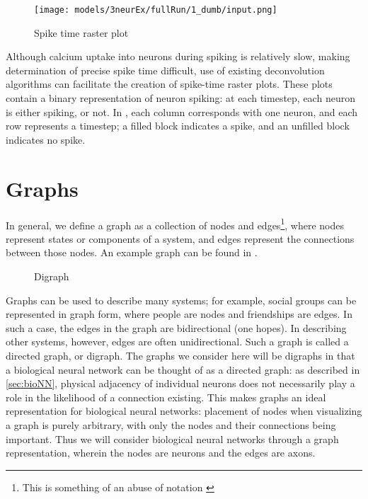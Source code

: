 \begin{wrapfigure}[8]{r}{.25\textwidth}
	\centering
	\vspace{-14pt}
	\texttt{[image: models/3neurEx/fullRun/1\_dumb/input.png]}
	\captionsetup{width=.85\linewidth}
	\caption{Spike time raster plot}
	\label{fig:rasterplot}
\end{wrapfigure}
Although calcium uptake into neurons during spiking is relatively slow, making 
determination of precise spike time difficult, use of existing deconvolution 
algorithms can facilitate the creation of spike-time raster plots\cite{Xu8025}.  
These plots contain a binary representation of neuron spiking: at each timestep, 
each neuron is either spiking, or not. In , each column 
corresponds with one neuron, and each row represents a timestep; a filled block 
indicates a spike, and an unfilled block indicates no spike.


\section{Graphs}
In general, we define a graph as a collection of nodes and edges\footnote{This 
is something of an abuse of notation \cite{networksciencebook}}, where nodes 
represent states or components of a system, and edges represent the connections 
between those nodes\cite{networksciencebook}. An example graph can be found in 
.

\begin{wrapfigure}[6]{l}{.28\textwidth}
	\centering
	\vspace{-5pt}
	
	\caption{Digraph}
	\label{fig:digraph}
\end{wrapfigure}
\noindent Graphs can be used to describe many systems; for example, social 
groups can be represented in graph form, where people are nodes and friendships 
are edges.  In such a case, the edges in the graph are bidirectional (one 
hopes). In describing other systems, however, edges are often unidirectional.  
Such a graph is called a directed graph, or digraph.\cite{networksciencebook} 
The graphs we consider here will be digraphs in that a biological neural network 
can be thought of as a directed graph: as described in \ref{sec:bioNN}, physical 
adjacency of individual neurons does not necessarily play a role in the 
likelihood of a connection existing. This makes graphs an ideal representation 
for biological neural networks: placement of nodes when visualizing a graph is 
purely arbitrary, with only the nodes and their connections being important.  
Thus we will consider biological neural networks through a graph representation, 
wherein the nodes are neurons and the edges are axons.

